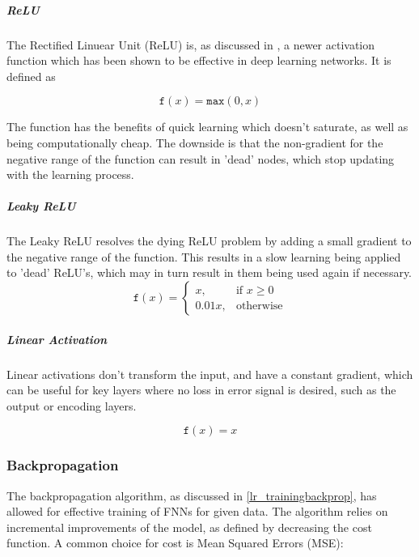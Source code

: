 \documentclass[a4paper,11pt,oneside]{article}
\theoremstyle{plain}
\theoremstyle{definition}
\begin{document}
\subparagraph{ReLU}

The Rectified Linuear Unit (ReLU) is, as discussed in , a newer activation function which has been shown to be effective in deep learning networks. It is defined as

\begin{equation}\label{func_relu}
\texttt{f}(x) = \texttt{max}(0, x)
\end{equation}

The function has the benefits of quick learning which doesn't saturate, as well as being computationally cheap. The downside is that the non-gradient for the negative range of the function can result in 'dead' nodes, which stop updating with the learning process.

\subparagraph{Leaky ReLU}

The Leaky ReLU resolves the dying ReLU problem by adding a small gradient to the negative range of the function. This results in a slow learning being applied to 'dead' ReLU's, which may in turn result in them being used again if necessary.
\begin{equation}\end{equation}\label{func_leaky_relu}
\[
\texttt{f}(x)= 
\begin{cases}
x,& \text{if } x\geq 0\\
0.01x,              & \text{otherwise}
\end{cases}
\]


\subparagraph{Linear Activation}

Linear activations don't transform the input, and have a constant gradient, which can be useful for key layers where no loss in error signal is desired, such as the output or encoding layers.

\begin{equation}\label{func_linear}
\texttt{f}(x) = x
\end{equation}


\subsubsection{Backpropagation}\label{imp_backprop}

The backpropagation algorithm, as discussed in \ref{lr_trainingbackprop}, has allowed for effective training of FNNs for given data. The algorithm relies on incremental improvements of the model, as defined by decreasing the cost function. A common choice for cost is Mean Squared Errors (MSE):
\end{document}
